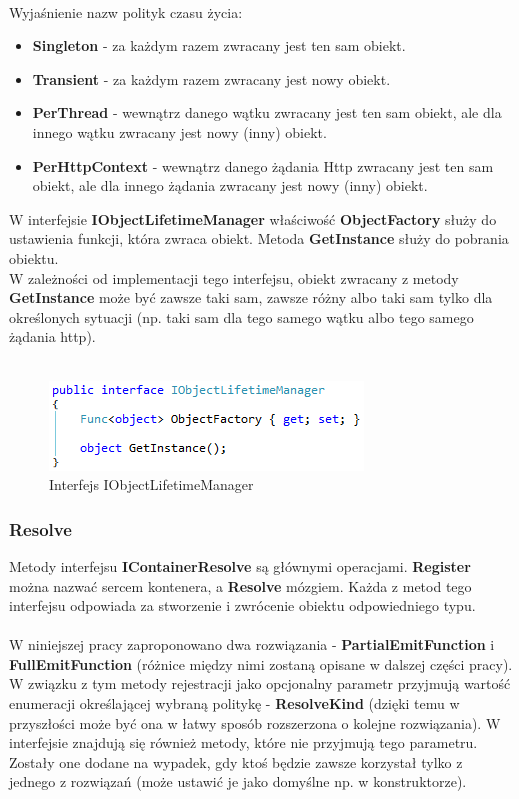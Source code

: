 \documentclass[12pt]{article}
\begin{document}
\\
Wyjaśnienie nazw polityk czasu życia:
\begin{itemize}
	\item \textbf{Singleton} - za każdym razem zwracany jest ten sam obiekt.
	\item \textbf{Transient} - za każdym razem zwracany jest nowy obiekt.
	\item \textbf{PerThread} - wewnątrz danego wątku zwracany jest ten sam obiekt, ale dla innego wątku zwracany jest nowy (inny) obiekt.
	\item \textbf{PerHttpContext} - wewnątrz danego żądania Http zwracany jest ten sam obiekt, ale dla innego żądania zwracany jest nowy (inny) obiekt.
\end{itemize}

W interfejsie \textbf{IObjectLifetimeManager} właściwość \textbf{ObjectFactory} służy do ustawienia funkcji, która zwraca obiekt. Metoda \textbf{GetInstance} służy do pobrania obiektu.\\
W zależności od implementacji tego interfejsu, obiekt zwracany z metody \textbf{GetInstance} może być zawsze taki sam, zawsze różny albo taki sam tylko dla określonych sytuacji (np. taki sam dla tego samego wątku albo tego samego żądania http).\\ \\
\begin{figure}[H]
	\begin{center}
  		\includegraphics{IObjectLifetimeManager.png}
  		\caption{Interfejs IObjectLifetimeManager}
  		\label{fig:IObjectLifetimeManager}
	\end{center}
\end{figure}

\subsubsection{Resolve}
Metody interfejsu \textbf{IContainerResolve} są głównymi operacjami. \textbf{Register} można nazwać sercem kontenera, a \textbf{Resolve} mózgiem. Każda z metod tego interfejsu odpowiada za stworzenie i zwrócenie obiektu odpowiedniego typu.\\
\\
W niniejszej pracy zaproponowano dwa rozwiązania - \textbf{PartialEmitFunction} i \textbf{FullEmitFunction} (różnice między nimi zostaną opisane w dalszej części pracy). W związku z tym metody rejestracji jako opcjonalny parametr przyjmują wartość enumeracji określającej wybraną politykę - \textbf{ResolveKind} (dzięki temu w przyszłości może być ona w łatwy sposób rozszerzona o kolejne rozwiązania). W interfejsie znajdują się również metody, które nie przyjmują tego parametru. Zostały one dodane na wypadek, gdy ktoś będzie zawsze korzystał tylko z jednego z rozwiązań (może ustawić je jako domyślne np. w konstruktorze).
\end{document}
